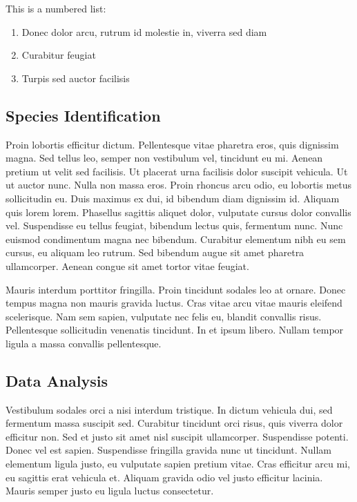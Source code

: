 \documentclass[
    a4paper, %
    10pt, %
    unnumbered sections, %
    two side, %
]{LTJournalArticle}
\begin{document}
This is a numbered list:

\begin{enumerate}
    \item Donec dolor arcu, rutrum id molestie in, viverra sed diam
    \item Curabitur feugiat
    \item Turpis sed auctor facilisis
\end{enumerate}

\subsection{Species Identification}

Proin lobortis efficitur dictum. Pellentesque vitae pharetra eros, quis dignissim magna. Sed tellus leo, semper non vestibulum vel, tincidunt eu mi. Aenean pretium ut velit sed facilisis. Ut placerat urna facilisis dolor suscipit vehicula. Ut ut auctor nunc. Nulla non massa eros. Proin rhoncus arcu odio, eu lobortis metus sollicitudin eu. Duis maximus ex dui, id bibendum diam dignissim id. Aliquam quis lorem lorem. Phasellus sagittis aliquet dolor, vulputate cursus dolor convallis vel. Suspendisse eu tellus feugiat, bibendum lectus quis, fermentum nunc. Nunc euismod condimentum magna nec bibendum. Curabitur elementum nibh eu sem cursus, eu aliquam leo rutrum. Sed bibendum augue sit amet pharetra ullamcorper. Aenean congue sit amet tortor vitae feugiat.

Mauris interdum porttitor fringilla. Proin tincidunt sodales leo at ornare. Donec tempus magna non mauris gravida luctus. Cras vitae arcu vitae mauris eleifend scelerisque. Nam sem sapien, vulputate nec felis eu, blandit convallis risus. Pellentesque sollicitudin venenatis tincidunt. In et ipsum libero. Nullam tempor ligula a massa convallis pellentesque.

\subsection{Data Analysis}

Vestibulum sodales orci a nisi interdum tristique. In dictum vehicula dui, sed fermentum massa suscipit sed. Curabitur tincidunt orci risus, quis viverra dolor efficitur non. Sed et justo sit amet nisl suscipit ullamcorper. Suspendisse potenti. Donec vel est sapien. Suspendisse fringilla gravida nunc ut tincidunt. Nullam elementum ligula justo, eu vulputate sapien pretium vitae. Cras efficitur arcu mi, eu sagittis erat vehicula et. Aliquam gravida odio vel justo efficitur lacinia. Mauris semper justo eu ligula luctus consectetur.
\end{document}
